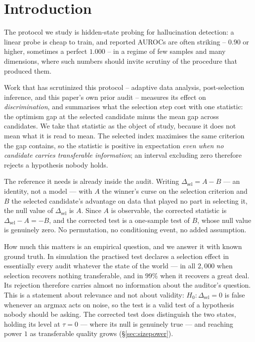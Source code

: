 \documentclass{article}
\begin{document}
\section{Introduction}

The protocol we study is
hidden-state probing for hallucination detection: a linear probe is cheap to
train, and reported AUROCs are often striking -- $0.90$ or higher, sometimes a
perfect $1.000$ -- in a regime of few samples and many dimensions, where such
numbers should invite scrutiny of the procedure that produced them.

Work that has scrutinized this protocol -- adaptive data analysis,
post-selection inference, and this paper's own prior audit -- measures its
effect on \emph{discrimination}, and summarises what the selection step cost
with one statistic: the optimism gap at the selected candidate minus the mean
gap across candidates. We take that statistic as the object of study, because
it does not mean what it is read to mean. The selected index maximises the
same criterion the gap contains, so the statistic is positive in expectation
\emph{even when no candidate carries transferable information}; an interval
excluding zero therefore rejects a hypothesis nobody holds.

The reference it needs is already inside the audit. Writing
$\Delta_{\text{sel}}=A-B$ --- an identity, not a model --- with $A$ the
winner's curse on the selection criterion and $B$ the selected candidate's
advantage on data that played no part in selecting it, the null value of
$\Delta_{\text{sel}}$ is $A$. Since $A$ is observable, the corrected statistic
is $\Delta_{\text{sel}}-A=-B$, and the corrected test is a one-sample test of
$B$, whose null value is genuinely zero. No permutation, no conditioning
event, no added assumption.

How much this matters is an empirical question, and we answer it with known
ground truth. In simulation the practised test declares a selection effect in
essentially every audit whatever the state of the world --- in all $2{,}000$
when selection recovers nothing transferable, and in $99\%$ when it recovers
a great deal. Its rejection therefore carries almost no information about the
auditor's question. This is a statement about relevance and not about
validity: $H_0:\Delta_{\text{sel}}=0$ is false whenever an argmax acts on
noise, so the test is a valid test of a hypothesis nobody should be asking.
The corrected test does distinguish the two states, holding its level at
$\tau=0$ --- where its null is genuinely true --- and reaching power $1$ as
transferable quality grows (\S\ref{sec:sizepower}).
\end{document}
